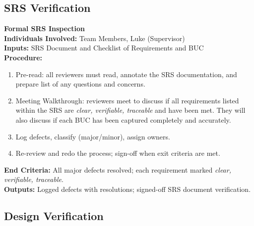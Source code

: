 \documentclass[12pt, titlepage]{article}
\begin{document}
\subsection{SRS Verification}




\noindent\textbf{Formal SRS Inspection} \\
\noindent\textbf{Individuals Involved:} Team Members, Luke (Supervisor) \\
\noindent\textbf{Inputs:} SRS Document and Checklist of Requirements and BUC \\
\noindent\textbf{Procedure:}
\begin{enumerate}
  \item Pre-read: all reviewers must read, annotate the SRS documentation, and prepare list of any questions and concerns.
  \item Meeting Walkthrough: reviewers meet to discuss if all requirements listed within the SRS are \emph{clear, verifiable, traceable} and have been met.
  They will also discuss if each BUC has been captured completely and accurately.
  \item Log defects, classify (major/minor), assign owners.
  \item Re-review and redo the process; sign-off when exit criteria are met.
\end{enumerate}
\noindent\textbf{End Criteria:} All major defects resolved; each requirement marked \emph{clear, verifiable, traceable}. \\
\noindent\textbf{Outputs:} Logged defects with resolutions; signed-off SRS document verification. \\


\subsection{Design Verification}
\end{document}
